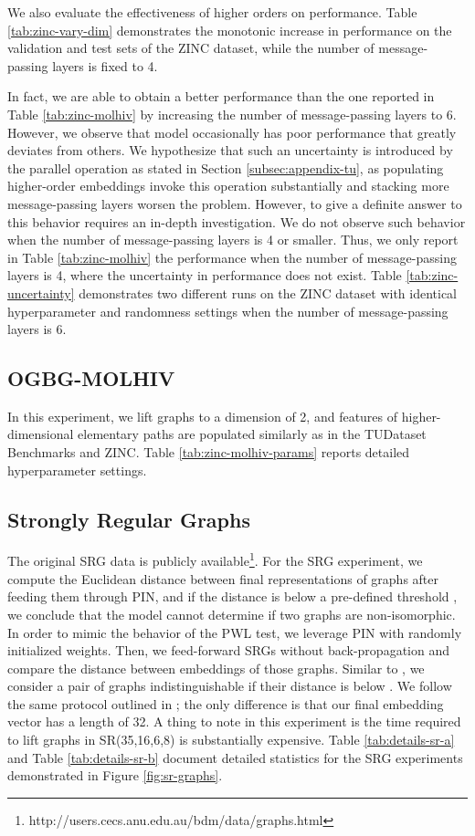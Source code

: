 \documentclass[letterpaper]{article} \usepackage{aaai24}  \usepackage{times}  \usepackage{helvet}  \usepackage{courier}  \usepackage[hyphens]{url}  \usepackage{graphicx} \urlstyle{rm} \def\UrlFont{\rm}  \usepackage{natbib}  \usepackage{caption} \frenchspacing  \setlength{\pdfpagewidth}{8.5in} \setlength{\pdfpageheight}{11in} \usepackage{algorithm}
\begin{document}
We also evaluate the effectiveness of higher orders on performance. Table \ref{tab:zinc-vary-dim} demonstrates the monotonic increase in performance on the validation and test sets of the ZINC dataset, while the number of message-passing layers is fixed to 4.

In fact, we are able to obtain a better performance than the one reported in Table \ref{tab:zinc-molhiv} by increasing the number of message-passing layers to 6. However, we observe that model occasionally has poor performance that greatly deviates from others.  We hypothesize that such an uncertainty is introduced by the parallel operation as stated in Section \ref{subsec:appendix-tu}, as populating higher-order embeddings invoke this operation substantially and stacking more message-passing layers worsen the problem. However, to give a definite answer to this behavior requires an in-depth investigation. We do not observe such behavior when the number of message-passing layers is 4 or smaller. Thus, we only report in Table \ref{tab:zinc-molhiv} the performance when the number of message-passing layers is 4, where the uncertainty in performance does not exist. Table \ref{tab:zinc-uncertainty} demonstrates two different runs on the ZINC dataset with identical hyperparameter and randomness settings when the number of message-passing layers is 6.

\subsection{OGBG-MOLHIV}

In this experiment, we lift graphs to a dimension of 2, and features of higher-dimensional elementary paths are populated similarly as in the TUDataset Benchmarks and ZINC. Table \ref{tab:zinc-molhiv-params} reports detailed hyperparameter settings.

\subsection{Strongly Regular Graphs}

The original SRG data is publicly available\footnote{http://users.cecs.anu.edu.au/bdm/data/graphs.html}. For the SRG experiment, we compute the Euclidean distance between final representations of graphs after feeding them through PIN, and if the distance is below a pre-defined threshold , we conclude that the model cannot determine if two graphs are non-isomorphic. In order to mimic the behavior of the PWL test, we leverage PIN with randomly initialized weights. Then, we feed-forward SRGs without back-propagation and compare the distance between embeddings of those graphs. Similar to \cite{bodnar_weisfeiler_2021, bodnar_weisfeiler_2022, bouritsas_improving_2021}, we consider a pair of graphs indistinguishable if their distance is below . We follow the same protocol outlined in \cite{bodnar_weisfeiler_2022}; the only difference is that our final embedding vector has a length of 32. A thing to note in this experiment is the time required to lift graphs in SR(35,16,6,8) is substantially expensive. Table \ref{tab:details-sr-a} and Table \ref{tab:details-sr-b} document detailed statistics for the SRG experiments demonstrated in Figure \ref{fig:sr-graphs}.
\end{document}
